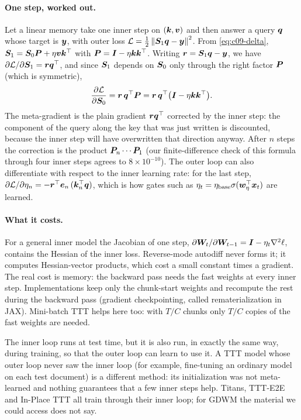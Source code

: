 \paragraph{One step, worked out.} Let a linear memory take one inner step on $(\bm{k}, \bm{v})$ and
then answer a query $\bm{q}$ whose target is $\bm{y}$, with outer loss
$\mathcal{L} = \frac12\left\lVert \bm{S}_1\bm{q} - \bm{y}\right\rVert^2$. From \eqref{eq:c09-delta},
$\bm{S}_1 = \bm{S}_0\bm{P} + \eta\bm{v}\bm{k}^{\top}$ with $\bm{P} = \bm{I} - \eta\bm{k}\bm{k}^{\top}$. Writing $\bm{r} = \bm{S}_1\bm{q}-\bm{y}$,
we have $\partial\mathcal{L}/\partial\bm{S}_1 = \bm{r}\bm{q}^{\top}$, and since $\bm{S}_1$ depends on $\bm{S}_0$ only
through the right factor $\bm{P}$ (which is symmetric),
\begin{equation}\label{eq:c09-metagrad}
  \frac{\partial\mathcal{L}}{\partial\bm{S}_0} = \bm{r}\,\bm{q}^{\top}\bm{P} = \bm{r}\,\bm{q}^{\top}\big(\bm{I} - \eta\bm{k}\bm{k}^{\top}\big).
\end{equation}
The meta-gradient is the plain gradient $\bm{r}\bm{q}^{\top}$ corrected by the inner step: the component
of the query along the key that was just written is discounted, because the inner step will
have overwritten that direction anyway. After $n$ steps the correction is the product
$\bm{P}_n\cdots\bm{P}_1$ (our finite-difference check of this formula through four inner steps
agrees to $8\times10^{-10}$). The outer loop can also differentiate with respect to the inner
learning rate: for the last step, $\partial\mathcal{L}/\partial\eta_n = -\bm{r}^{\top}\bm{e}_n\,(\bm{k}_n^{\top}\bm{q})$,
which is how gates such as $\eta_t = \eta_{\text{base}}\sigma(\bm{w}_\eta^{\top}\bm{x}_t)$ are learned.

\paragraph{What it costs.} For a general inner model the Jacobian of one step,
$\partial\bm{W}_t/\partial\bm{W}_{t-1} = \bm{I} - \eta_t\nabla^2\ell$, contains the Hessian of the inner
loss. Reverse-mode autodiff never forms it; it computes Hessian-vector products, which cost a
small constant times a gradient. The real cost is memory: the backward pass needs the fast
weights at every inner step. Implementations keep only the chunk-start weights and recompute
the rest during the backward pass (gradient checkpointing, called rematerialization in JAX).
Mini-batch TTT helps here too: with $T/C$ chunks only $T/C$ copies of the fast weights are
needed.

\begin{pitfall}[title={Pitfall: ``test time'' does not mean ``untrained''}]
The inner loop runs at test time, but it is also run, in exactly the same way, during
training, so that the outer loop can learn to use it. A TTT model whose outer loop never saw
the inner loop (for example, fine-tuning an ordinary model on each test document) is a
different method: its initialization was not meta-learned and nothing guarantees that a few
inner steps help. Titans, TTT-E2E and In-Place TTT all train through their inner loop; for GDWM
the material we could access does not say.
\end{pitfall}

